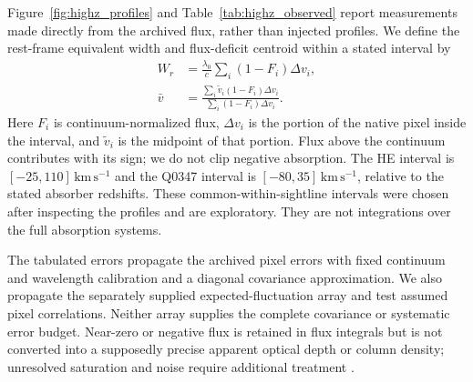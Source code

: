 Figure~\ref{fig:highz_profiles} and Table~\ref{tab:highz_observed} report measurements made directly from the archived flux, rather than injected profiles. We define the rest-frame equivalent width and flux-deficit centroid within a stated interval by
\begin{align}
 W_r&=\frac{\lambda_0}{c}\sum_i(1-F_i)\Delta v_i,\\
 \bar v&=\frac{\sum_i\widetilde v_i(1-F_i)\Delta v_i}
                  {\sum_i(1-F_i)\Delta v_i}.
 \label{eq:profile_moments}
\end{align}
Here $F_i$ is continuum-normalized flux, $\Delta v_i$ is the portion of the native pixel inside the interval, and $\widetilde v_i$ is the midpoint of that portion. Flux above the continuum contributes with its sign; we do not clip negative absorption. The HE interval is $[-25,110]\,\mathrm{km\,s^{-1}}$ and the Q0347 interval is $[-80,35]\,\mathrm{km\,s^{-1}}$, relative to the stated absorber redshifts. These common-within-sightline intervals were chosen after inspecting the profiles and are exploratory. They are not integrations over the full absorption systems.

The tabulated errors propagate the archived pixel errors with fixed continuum and wavelength calibration and a diagonal covariance approximation. We also propagate the separately supplied expected-fluctuation array and test assumed pixel correlations. Neither array supplies the complete covariance or systematic error budget. Near-zero or negative flux is retained in flux integrals but is not converted into a supposedly precise apparent optical depth or column density; unresolved saturation and noise require additional treatment \cite{SavageSembach1991,Fox2005AOD}.

\begin{table}[htbp]
\caption{Measurements of actual finite-window absorption profiles. Errors are conditional diagonal statistical $1\sigma$, not complete physical-frequency uncertainties. $\Delta_C$ is the maximum absolute centroid change under a prescribed $\pm1\%$ continuum perturbation; $\Delta_W$ is the maximum change under the stated $10\,\mathrm{km\,s^{-1}}$ boundary variations. These sensitivities are not random error bars. The high-redshift red windows are omitted from this science-oriented table because of contamination or low signal-to-noise; their screening integrals remain in the data release. HE entries remain subject to blend and saturation review.}
\label{tab:highz_observed}
\centering
\small
\setlength{\tabcolsep}{5pt}

\end{table}

